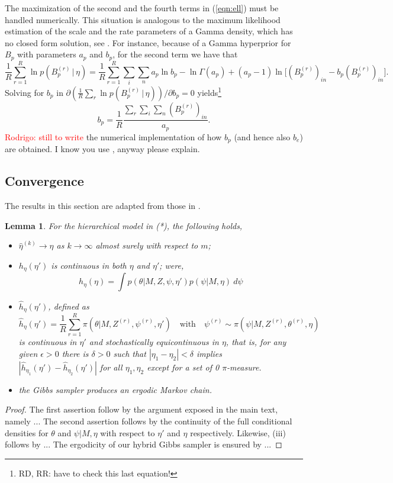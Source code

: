 \documentclass[11pt]{amsart}
\newtheorem{lemma}{Lemma}
\theoremstyle{definition}
\theoremstyle{remark}
\begin{document}
The maximization of the second and the fourth terms in (\ref{eqn:ell})
must be handled numerically. This situation is analogous to the
maximum likelihood estimation of the scale and the rate parameters of
a Gamma density, which has no closed form solution, see \cite{CW}. For
instance, because of a Gamma hyperprior for $B_p$ with parameters
$a_p$ and $b_p$, for the second term we have that
\[
   \frac{1}{R}\sum_{r=1}^R \ln p(B_p^{(r)}\,|\, \eta)
  =
   \frac{1}{R}\sum_{r=1}^R \sum_{i}\sum_{n} a_p\ln b_p  
    - \ln\Gamma(a_p) + 
  (a_p-1)\ln\big[(B_p^{(r)})_{in} - b_p(B_p^{(r)})_{in}\big].
\]
Solving for $b_p$ in $\partial(\frac{1}{R}\sum_r \ln p(B_p^{(r)}\,|\,
\eta))/\partial b_p = 0$  yields\footnote{RD, RR: have to check this
  last equation!}
\[
   b_p =\frac{1}{R} \frac{\sum_r\sum_i\sum_n (B_p^{(r)})_{in}}{a_p}.
\] 
\textcolor{red}{Rodrigo: still to write} the numerical implementation 
  of how $b_p$ (and hence also $b_e$) are obtained. I know you use
  \cite{J}, anyway  please explain.


\subsection{Convergence}
The results in this section are adapted from those in \cite{C01}.

\begin{lemma}\label{lem:technical} For the hierarchical model in (*), the 
  following holds,
\begin{itemize}
 \item[(i)] $\hat\eta^{(k)} \to \eta$ as $k \to \infty$ almost
   surely with respect to $m$; 
 \item[(ii)] $h_\eta(\eta')$ is continuous in both $\eta$ and $\eta'$;
   were, 
\[
  h_{\eta}(\eta) 
   = 
 \int p(\theta|M, Z, \psi, \eta')p(\psi|M, \eta)\ d\psi
\]
\item[(iii)] $\hat h_\eta(\eta')$, defined as
\[
  \hat h_\eta(\eta') 
  = 
 \frac{1}{R}\sum_{r=1}^R \pi(\theta|M, Z^{(r)}, \psi^{(r)}, \eta')
    \quad\text{with}\quad 
   \psi^{(r)} \sim \pi(\psi|M, Z^{(r)}, \theta^{(r)}, \eta)
\]
 is continuous in $\eta'$ and stochastically equicontinuous in $\eta$,
that is, for any given $\epsilon > 0$ there is $\delta>0$ such that
$|\eta_1 - \eta_2| < \delta$ implies $|\hat h_{\eta_1}(\eta') - \hat
h_{\eta_2}(\eta')|$ for all $\eta_1, \eta_2$ except for a set of 0
$\pi$-measure.
 \item[(iv)] the Gibbs sampler produces an ergodic Markov chain.
\end{itemize}
\end{lemma}
\begin{proof}  The first assertion follow by the argument exposed in
  the main text, namely ... The second assertion follows by the
  continuity of the full conditional densities for $\theta$ and
  $\psi|M, \eta$ with respect to $\eta'$ and $\eta$
  respectively. Likewise, (iii) follows by ... The ergodicity of our
  hybrid Gibbs sampler is ensured by ...
\end{proof}
\end{document}
